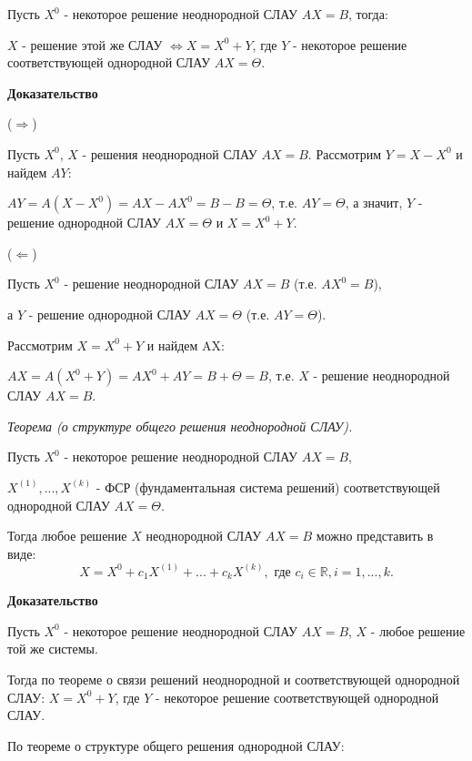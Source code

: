 Пусть $X^0$ - некоторое решение неоднородной СЛАУ $AX = B$, тогда:

$X$ - решение этой же СЛАУ $\iff X = X^0 + Y$, где $Y$ - некоторое решение соответствующей однородной СЛАУ $AX = \Theta$.

\vspace*{15pt}

{\bf {Доказательство}}

($\Rightarrow$)  

Пусть $X^0$, $X$ - решения неоднородной СЛАУ $AX = B$. Рассмотрим $Y = X - X^0$ и найдем $AY$:

$AY = A(X - X^0) = AX - AX^0 = B - B = \Theta$, т.е. $AY = \Theta$, а значит, $Y$ - решение однородной СЛАУ $AX = \Theta$ и $X = X^0 + Y$.

\vspace*{15pt}

($\Leftarrow$)  

Пусть $X^0$ - решение неоднородной СЛАУ $AX = B$ (т.е. $AX^0 = B$),

а $Y$ - решение однородной СЛАУ $AX = \Theta$ (т.е. $AY = \Theta$).

Рассмотрим $X = X^0 + Y$ и найдем AX:

$AX = A(X^0 + Y) = AX^0 + AY = B + \Theta = B$, т.е. $X$ - решение неоднородной СЛАУ $AX = B$.  

\ep


\textit {Теорема (о структуре общего решения неоднородной СЛАУ).} 

\vspace*{15pt}

Пусть $X^0$ - некоторое решение неоднородной СЛАУ $AX = B$,

$X^{(1)}, ..., X^{(k)}$ - ФСР (фундаментальная система решений) соответствующей однородной СЛАУ $AX = \Theta$.

Тогда любое решение $X$ неоднородной СЛАУ $AX = B$ можно представить в виде:
$$X = X^0 + c_1X^{(1)} + ... + c_kX^{(k)}, \text{ где } c_i \in \mathbb{R}, i = 1, ..., k.$$

{\bf {Доказательство}}

Пусть $X^0$ - некоторое решение неоднородной СЛАУ $AX = B$, $X$ - любое решение той же системы.

Тогда по теореме о связи решений неоднородной и соответствующей однородной СЛАУ:
$X = X^0 + Y$, где $Y$ - некоторое решение соответствующей однородной СЛАУ.

По теореме о структуре общего решения однородной СЛАУ:

